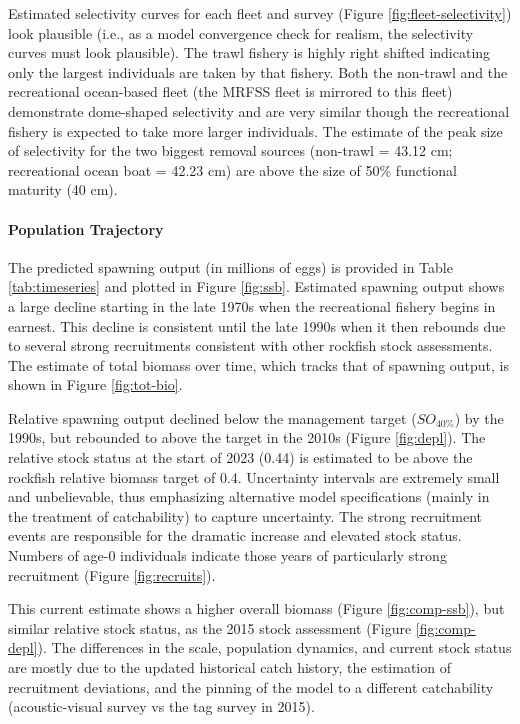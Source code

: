\documentclass[11pt,
  english,
  letterpaper,
]{article}
\begin{document}
Estimated selectivity curves for each fleet and survey (Figure \ref{fig:fleet-selectivity}) look plausible (i.e., as a model convergence check for realism, the selectivity curves must look plausible). The trawl fishery is highly right shifted indicating only the largest individuals are taken by that fishery. Both the non-trawl and the recreational ocean-based fleet (the MRFSS fleet is mirrored to this fleet) demonstrate dome-shaped selectivity and are very similar though the recreational fishery is expected to take more larger individuals. The estimate of the peak size of selectivity for the two biggest removal sources (non-trawl = 43.12 cm; recreational ocean boat = 42.23 cm) are above the size of 50\% functional maturity (40 cm).

\hypertarget{population-trajectory}{%
\paragraph{Population Trajectory}\label{population-trajectory}}

The predicted spawning output (in millions of eggs) is provided in Table \ref{tab:timeseries} and plotted in Figure \ref{fig:ssb}. Estimated spawning output shows a large decline starting in the late 1970s when the recreational fishery begins in earnest. This decline is consistent until the late 1990s when it then rebounds due to several strong recruitments consistent with other rockfish stock assessments. The estimate of total biomass over time, which tracks that of spawning output, is shown in Figure \ref{fig:tot-bio}.

Relative spawning output declined below the management target (\(SO_{40\%}\)) by the 1990s, but rebounded to above the target in the 2010s (Figure \ref{fig:depl}). The relative stock status at the start of 2023 (0.44) is estimated to be above the rockfish relative biomass target of 0.4. Uncertainty intervals are extremely small and unbelievable, thus emphasizing alternative model specifications (mainly in the treatment of catchability) to capture uncertainty. The strong recruitment events are responsible for the dramatic increase and elevated stock status. Numbers of age-0 individuals indicate those years of particularly strong recruitment (Figure \ref{fig:recruits}).

This current estimate shows a higher overall biomass (Figure \ref{fig:comp-ssb}), but similar relative stock status, as the 2015 stock assessment (Figure \ref{fig:comp-depl}). The differences in the scale, population dynamics, and current stock status are mostly due to the updated historical catch history, the estimation of recruitment deviations, and the pinning of the model to a different catchability (acoustic-visual survey vs the tag survey in 2015).
\end{document}
